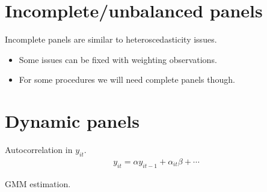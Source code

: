 \section{Incomplete/unbalanced panels} %
\begin{multicols}{2}
Incomplete panels are similar to heteroscedasticity issues.
\begin{itemize}
  \item Some issues can be fixed with weighting observations.
  \item For some procedures we will need complete panels though.
\end{itemize}



\end{multicols}



\section{Dynamic panels} %
\begin{multicols}{2}
Autocorrelation in $y_{it}$.
\begin{align*}
  y_{it} = \alpha y_{it-1}+\alpha_{it}\beta+\cdots
\end{align*}

GMM estimation.

\end{multicols}


